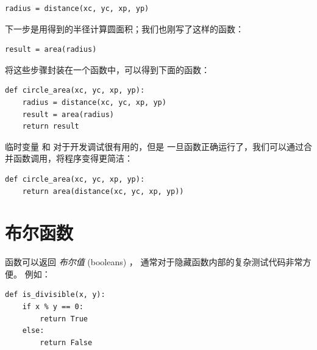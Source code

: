 \begin{lstlisting}
radius = distance(xc, yc, xp, yp)
\end{lstlisting}

%

下一步是用得到的半径计算圆面积；我们也刚写了这样的函数：

\begin{lstlisting}
result = area(radius)
\end{lstlisting}

%

将这些步骤封装在一个函数中，可以得到下面的函数：
  

\begin{lstlisting}
def circle_area(xc, yc, xp, yp):
    radius = distance(xc, yc, xp, yp)
    result = area(radius)
    return result
\end{lstlisting}

%

临时变量  和  对于开发调试很有用的，但是
一旦函数正确运行了，我们可以通过合并函数调用，将程序变得更简洁：

\begin{lstlisting}
def circle_area(xc, yc, xp, yp):
    return area(distance(xc, yc, xp, yp))
\end{lstlisting}

%

\section{布尔函数}
\label{boolean}


函数可以返回 {\em 布尔值} (booleans) ， 通常对于隐藏函数内部的复杂测试代码非常方便。 例如：

\begin{lstlisting}
def is_divisible(x, y):
    if x % y == 0:
        return True
    else:
        return False
\end{lstlisting}


